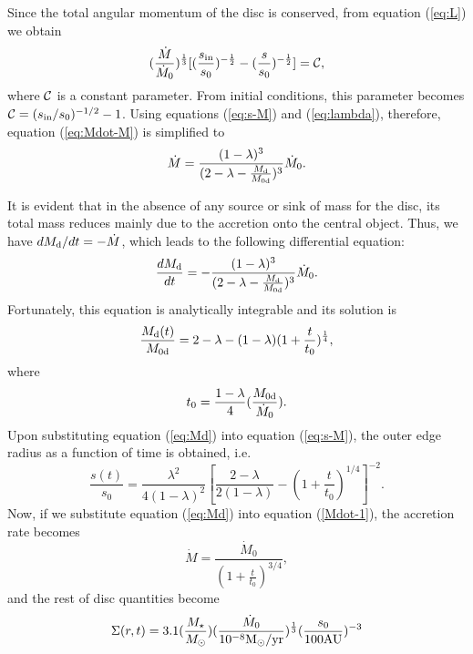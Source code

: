 \documentclass[apj]{emulateapj}
\begin{document}
Since the total angular momentum of the disc is conserved, from equation (\ref{eq:L}) we obtain
%
\begin{equation}\label{eq:Mdot-M}
(\frac{\dot{M}}{\dot{M}_0})^{\frac{1}{3}} [(\frac{s_{\rm in}}{s_0})^{-\frac{1}{2}}-(\frac{s}{s_0})^{-\frac{1}{2}}]={\cal C},
\end{equation}
%
where ${\cal C}$ is a constant parameter. From initial conditions, this parameter becomes  ${\cal C}=(s_{\rm in}/s_0)^{-1/2} -1$. Using equations (\ref{eq:s-M}) and (\ref{eq:lambda}), therefore, equation (\ref{eq:Mdot-M}) is simplified to 
%
%
\begin{equation}\label{Mdot-1}
\dot{M}= \frac{(1-\lambda)^3}{(2-\lambda - \frac{M_{\rm d}}{M_{\rm 0d}})^3} \dot{M}_0 .
\end{equation}
%

It is evident that in the absence of any source or sink of mass for the disc, its total mass reduces mainly due to the accretion onto the central object. Thus, we have $dM_{\rm d}/dt = - \dot{M}$, which leads to the following differential equation:
%
%
\begin{equation}
\frac{dM_{\rm d}}{dt}= - \frac{(1-\lambda)^3}{(2-\lambda - \frac{M_{\rm d}}{M_{\rm 0d}})^3} \dot{M}_0 .
\end{equation} 
%
Fortunately, this equation is analytically integrable and its solution is
%
%
\begin{equation}\label{eq:Md}
\frac{M_{\rm d} (t)}{M_{\rm 0d}} = 2-\lambda - (1-\lambda ) (1+\frac{t}{t_0} )^{\frac{1}{4}}, 
\end{equation}
%
%
where
%
\begin{equation}
t_0 = \frac{1-\lambda}{4} (\frac{M_{\rm 0d}}{\dot{M}_0}).
\end{equation}
%
Upon substituting equation (\ref{eq:Md}) into equation (\ref{eq:s-M}), the outer edge radius as a function of time is obtained, i.e.
%
\begin{equation}\label{eq:outer-thick}
\frac{s(t)}{s_0} =\frac{\lambda^2}{4 (1-\lambda )^2} [\frac{2-\lambda}{2(1-\lambda )} - (1+\frac{t}{t_0})^{1/4}]^{-2}.
\end{equation}
%
%
Now, if we substitute equation (\ref{eq:Md}) into equation (\ref{Mdot-1}), the accretion rate becomes
%
\begin{equation}
\dot{M}= \frac{\dot{M}_0}{(1+\frac{t}{t_0})^{3/4}},
\end{equation}
%
and the rest of disc quantities become
%
\begin{displaymath}
\Sigma (r, t) = 3.1 (\frac{M_{\star}}{M_{\odot}})(\frac{\dot{M}_0}{10^{-8} {\rm M}_{\odot}/{\rm yr}} )^{\frac{1}{3}} (\frac{s_0}{100 {\rm AU}})^{-3}
\end{displaymath}
\end{document}
